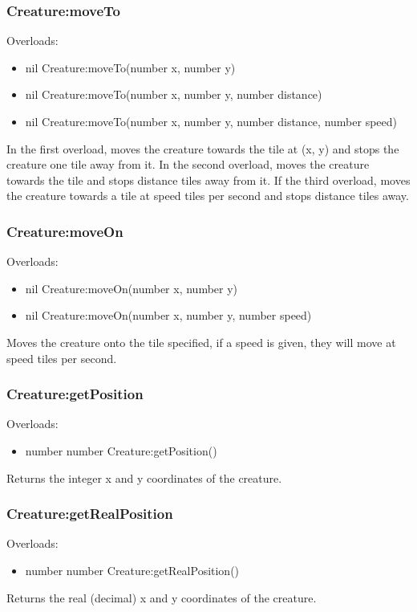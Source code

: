 \documentclass{book}
\newenvironment{ulist}
	{\begin{itemize}
			\itemsep0em}
	{\end{itemize}}
\begin{document}
\subsubsection{Creature:moveTo}
Overloads:
\begin{ulist}
	\item nil Creature:moveTo(number x, number y)
	\item nil Creature:moveTo(number x, number y, number distance)
	\item nil Creature:moveTo(number x, number y, number distance, number speed)
\end{ulist}
In the first overload, moves the creature towards the tile at (x, y) and stops the creature one tile away from it. In the second overload, moves the creature towards the tile and stops distance tiles away from it. If the third overload, moves the creature towards a tile at speed tiles per second and stops distance tiles away.

\subsubsection{Creature:moveOn}
Overloads:
\begin{ulist}
	\item nil Creature:moveOn(number x, number y)
	\item nil Creature:moveOn(number x, number y, number speed)
\end{ulist}
Moves the creature onto the tile specified, if a speed is given, they will move at speed tiles per second.

\subsubsection{Creature:getPosition}
Overloads:
\begin{ulist}
	\item number number Creature:getPosition()
\end{ulist}
Returns the integer x and y coordinates of the creature.

\subsubsection{Creature:getRealPosition}
Overloads:
\begin{ulist}
	\item number number Creature:getRealPosition()
\end{ulist}
Returns the real (decimal) x and y coordinates of the creature.
\end{document}
